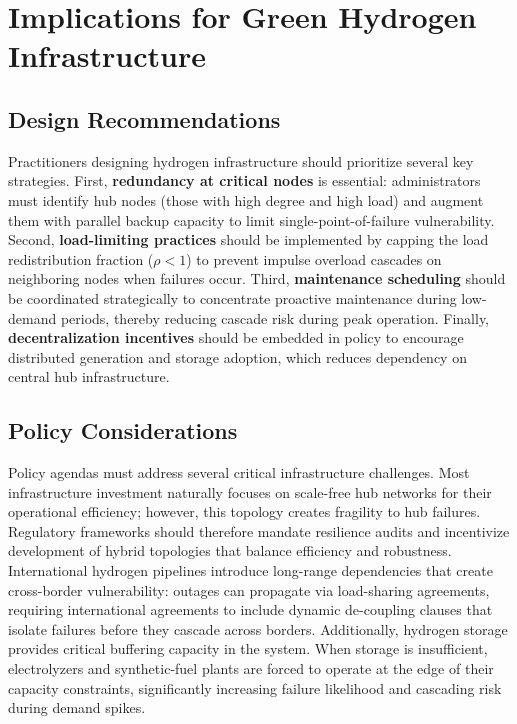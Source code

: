 \documentclass[12pt,a4paper,twoside]{report}
\begin{document}
\section{Implications for Green Hydrogen Infrastructure}

\subsection{Design Recommendations}

Practitioners designing hydrogen infrastructure should prioritize several key strategies. First, \textbf{redundancy at critical nodes} is essential: administrators must identify hub nodes (those with high degree and high load) and augment them with parallel backup capacity to limit single-point-of-failure vulnerability. Second, \textbf{load-limiting practices} should be implemented by capping the load redistribution fraction ($\rho < 1$) to prevent impulse overload cascades on neighboring nodes when failures occur. Third, \textbf{maintenance scheduling} should be coordinated strategically to concentrate proactive maintenance during low-demand periods, thereby reducing cascade risk during peak operation. Finally, \textbf{decentralization incentives} should be embedded in policy to encourage distributed generation and storage adoption, which reduces dependency on central hub infrastructure.

\subsection{Policy Considerations}

Policy agendas must address several critical infrastructure challenges. Most infrastructure investment naturally focuses on scale-free hub networks for their operational efficiency; however, this topology creates fragility to hub failures. Regulatory frameworks should therefore mandate resilience audits and incentivize development of hybrid topologies that balance efficiency and robustness. International hydrogen pipelines introduce long-range dependencies that create cross-border vulnerability: outages can propagate via load-sharing agreements, requiring international agreements to include dynamic de-coupling clauses that isolate failures before they cascade across borders. Additionally, hydrogen storage provides critical buffering capacity in the system. When storage is insufficient, electrolyzers and synthetic-fuel plants are forced to operate at the edge of their capacity constraints, significantly increasing failure likelihood and cascading risk during demand spikes.
\end{document}
